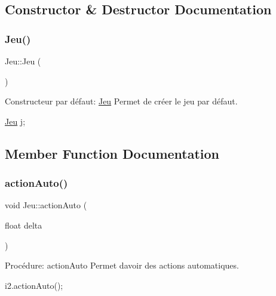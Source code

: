 \subsection{Constructor \& Destructor Documentation}
\mbox{\label{classJeu_acc5795ee00edf75516d3dfe65be3e6d6}} 
\subsubsection{\texorpdfstring{Jeu()}{Jeu()}}
{\footnotesize\ttfamily Jeu\+::\+Jeu (\begin{DoxyParamCaption}{ }\end{DoxyParamCaption})}



Constructeur par défaut\+: \hyperlink{classJeu}{Jeu} Permet de créer le jeu par défaut. 


\begin{DoxyCode}
\hyperlink{classJeu}{Jeu} j;
\end{DoxyCode}
 

\subsection{Member Function Documentation}
\mbox{\label{classJeu_a8d2a0773d8edcb42d5e055785ad4b71a}} 
\subsubsection{\texorpdfstring{action\+Auto()}{actionAuto()}}
{\footnotesize\ttfamily void Jeu\+::action\+Auto (\begin{DoxyParamCaption}\item[{float}]{delta }\end{DoxyParamCaption})}



Procédure\+: action\+Auto Permet d\textquotesingle{}avoir des actions automatiques. 


\begin{DoxyCode}
i2.actionAuto();
\end{DoxyCode}
 \mbox{\label{classJeu_a4f8c73b225819fb5a6ba342adc2f1fa4}} 

